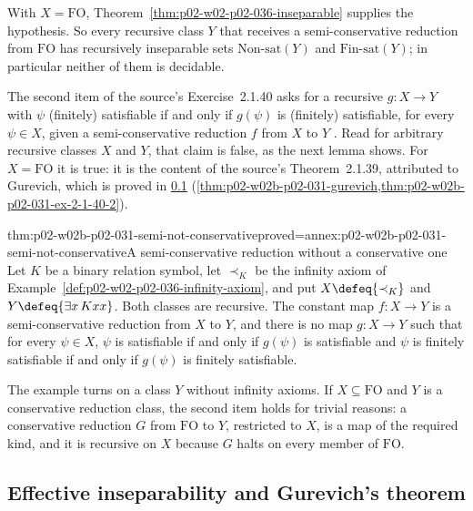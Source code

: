 With \(X=\mathrm{FO}\), Theorem~\ref{thm:p02-w02-p02-036-inseparable} supplies
the hypothesis.  So every recursive class \(Y\) that receives a
semi-conservative reduction from \(\mathrm{FO}\) has recursively inseparable
sets \(\mathrm{Non\text{-}sat}(Y)\) and \(\mathrm{Fin\text{-}sat}(Y)\); in
particular neither of them is decidable.

The second item of the source's Exercise~2.1.40 asks for a recursive
\(g:X\to Y\) with \(\psi\) (finitely) satisfiable if and only if \(g(\psi)\) is
(finitely) satisfiable, for every \(\psi\in X\), given a semi-conservative
reduction \(f\) from \(X\) to \(Y\)
\cite[Sect.~2.1.2, Exercise~2.1.40(2)]{BorgerGradelGurevich1997}.  Read for
arbitrary recursive classes \(X\) and \(Y\), that claim is false, as the next
lemma shows.  For \(X=\mathrm{FO}\) it is true: it is the content of the
source's Theorem~2.1.39, attributed to Gurevich, which is proved in
\cref{sec:p02-w02b-p02-031-gurevich}
(\cref{thm:p02-w02b-p02-031-gurevich,thm:p02-w02b-p02-031-ex-2-1-40-2}).

\begin{hblemma}{thm:p02-w02b-p02-031-semi-not-conservative}{proved=annex:p02-w02b-p02-031-semi-not-conservative}{A semi-conservative reduction without a conservative one}
Let \(K\) be a binary relation symbol, let \(\prec_K\) be the infinity axiom
of Example~\ref{def:p02-w02-p02-036-infinity-axiom}, and put
\(X\defeq\{\prec_K\}\) and \(Y\defeq\{\exists x\,Kxx\}\).  Both classes are
recursive.  The constant map \(f:X\to Y\) is a semi-conservative reduction
from \(X\) to \(Y\), and there is no map \(g:X\to Y\) such that for every
\(\psi\in X\), \(\psi\) is satisfiable if and only if \(g(\psi)\) is
satisfiable and \(\psi\) is finitely satisfiable if and only if \(g(\psi)\) is
finitely satisfiable.
\end{hblemma}

The example turns on a class \(Y\) without infinity axioms.  If \(X\subseteq
\mathrm{FO}\) and \(Y\) is a conservative reduction class, the second item holds
for trivial reasons: a conservative reduction \(G\) from \(\mathrm{FO}\) to
\(Y\), restricted to \(X\), is a map of the required kind, and it is recursive
on \(X\) because \(G\) halts on every member of \(\mathrm{FO}\).

\subsection{Effective inseparability and Gurevich's theorem}
\label{sec:p02-w02b-p02-031-gurevich}

